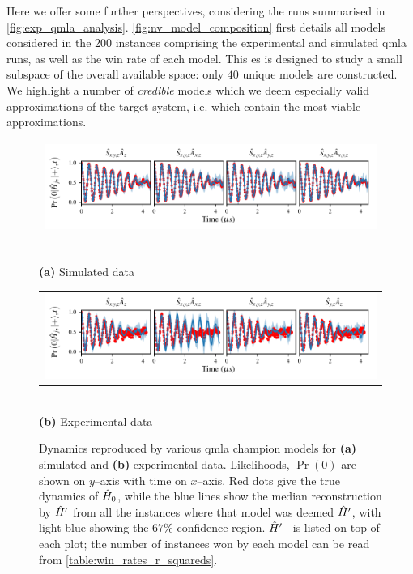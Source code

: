Here we offer some further perspectives, 
    considering the \glspl{run} summarised in \cref{fig:exp_qmla_analysis}.
\cref{fig:nv_model_composition} first details all \glspl{model} considered in the 200 \glspl{instance} 
    comprising the experimental and simulated \gls{qmla} \glspl{run}, 
    as well as the  \gls{win rate}  of each model. 
This \gls{es} is designed to study a small subspace of the overall available space:
    only $40$ unique models are constructed. 
We highlight a number of \emph{credible} models which we deem especially valid approximations of the target system, 
    i.e. which contain the most viable approximations. 
\par 

\begin{figure}[t]
    \centering
    \begin{tabular}{@{}c@{}}
        \includegraphics[scale=0.99]{experimental_study/figures/reproduced_dyamics_sim.pdf}
    \end{tabular}
    \\ \small \textbf{(a)} Simulated data
    \centering

    \begin{tabular}{@{}c@{}}
        \includegraphics[scale=0.99]{experimental_study/figures/reproduced_dyamics_exp.pdf}
    \end{tabular}
    \\ \small \textbf{(b)} Experimental data

    \caption[Dynamics reproduced by QMLA champion models for simulated/experimental data]{
        Dynamics reproduced by various \gls{qmla} \glspl{champion model} for \textbf{(a)} simulated and \textbf{(b)} experimental data. 
        Likelihoods, $\Pr(0)$ are shown on $y$--axis with time on $x$--axis. 
        Red dots give the true dynamics of $\hat{H}_0$, while the blue lines show the median reconstruction by $\hat{H}^{\prime}$
        from all the \glspl{instance} where that model was deemed $\hat{H}^{\prime}$, with light blue showing the $67\%$ confidence region.
        $\hat{H}^{\prime}$ \ is listed on top of each plot; the number of \glspl{instance} won by each model can be read from \cref{table:win_rates_r_squareds}.
        \figtableref 
        }
    \label{fig:nv_model_dynamics}
\end{figure}

